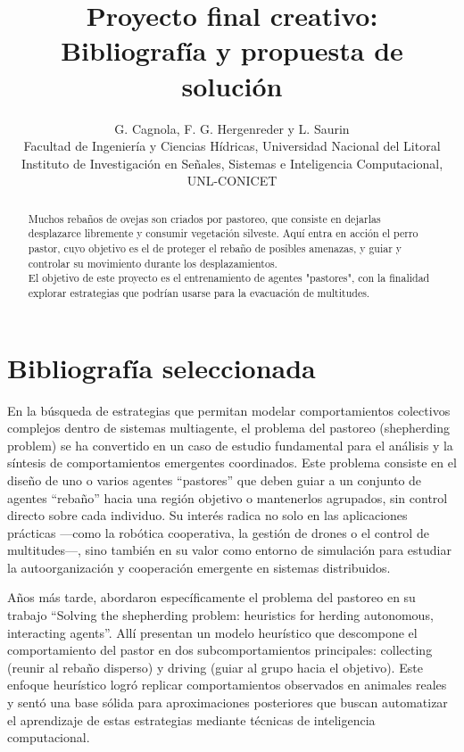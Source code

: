\documentclass[final]{article}
\begin{document}
\def\tablename{Tabla}          %

\title{Proyecto final creativo:\\
    Bibliografía y propuesta de solución}

\author{G. Cagnola, F. G. Hergenreder y L. Saurin \\
        Facultad de Ingeniería y Ciencias Hídricas,
        Universidad Nacional del Litoral \\
        Instituto de Investigación en Señales, Sistemas e Inteligencia Computacional, UNL-CONICET}

\maketitle

\begin{abstract}
Muchos rebaños de ovejas son criados por pastoreo, que consiste en dejarlas desplazarce libremente y consumir vegetación silveste.
Aquí entra en acción el perro pastor, cuyo objetivo es el de proteger el rebaño
de posibles amenazas, y guiar y controlar su movimiento durante los desplazamientos.\\
El objetivo de este proyecto es el entrenamiento de agentes "pastores", con la finalidad explorar estrategias que podrían usarse para la evacuación de multitudes.
\end{abstract}

\section{Bibliografía seleccionada}
En la búsqueda de estrategias que permitan modelar comportamientos colectivos complejos dentro de sistemas multiagente, el problema del pastoreo
(shepherding problem) se ha convertido en un caso de estudio fundamental para el análisis y la síntesis de comportamientos emergentes coordinados.
Este problema consiste en el diseño de uno o varios agentes “pastores” que deben guiar a un conjunto de agentes “rebaño” hacia una región objetivo
o mantenerlos agrupados, sin control directo sobre cada individuo. Su interés radica no solo en las aplicaciones prácticas —como la robótica cooperativa,
la gestión de drones o el control de multitudes—, sino también en su valor como entorno de simulación para estudiar la autoorganización y cooperación
emergente en sistemas distribuidos.

Años más tarde, \citet{Strombom} abordaron específicamente el problema del pastoreo en su trabajo “Solving the shepherding problem: heuristics
for herding autonomous, interacting agents”. Allí presentan un modelo heurístico que descompone el comportamiento del pastor en dos subcomportamientos
principales: collecting (reunir al rebaño disperso) y driving (guiar al grupo hacia el objetivo). Este enfoque heurístico logró replicar comportamientos
observados en animales reales y sentó una base sólida para aproximaciones posteriores que buscan automatizar el aprendizaje de estas estrategias mediante
técnicas de inteligencia computacional.
\end{document}
